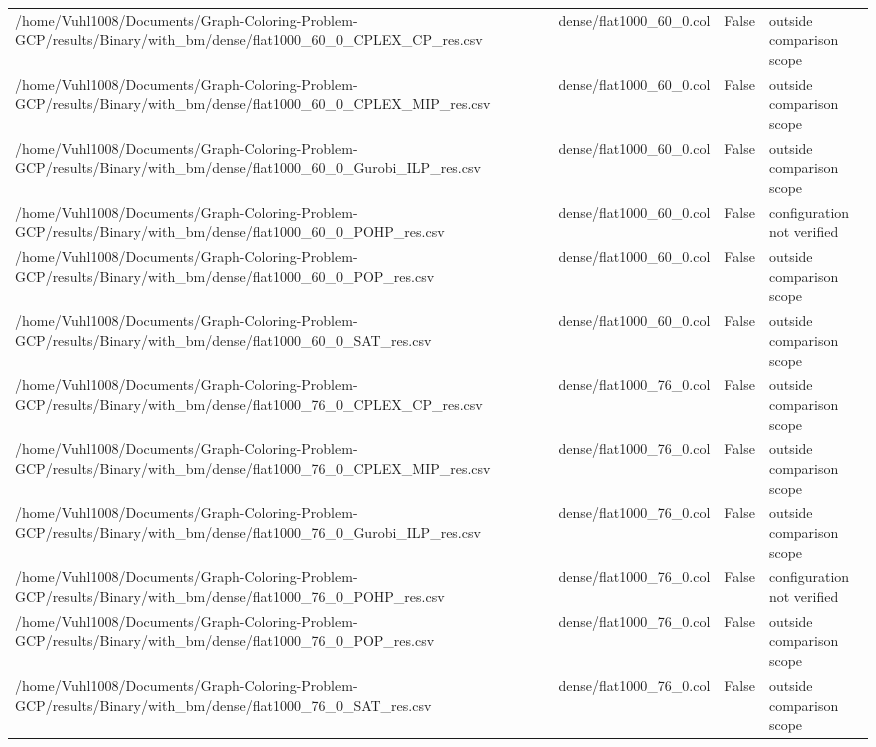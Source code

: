 \begin{table}[htbp]
\begin{tabular}{llll}
/home/Vuhl1008/Documents/Graph-Coloring-Problem-GCP/results/Binary/with\_bm/dense/flat1000\_60\_0\_CPLEX\_CP\_res.csv & dense/flat1000\_60\_0.col & False & outside comparison scope \\
/home/Vuhl1008/Documents/Graph-Coloring-Problem-GCP/results/Binary/with\_bm/dense/flat1000\_60\_0\_CPLEX\_MIP\_res.csv & dense/flat1000\_60\_0.col & False & outside comparison scope \\
/home/Vuhl1008/Documents/Graph-Coloring-Problem-GCP/results/Binary/with\_bm/dense/flat1000\_60\_0\_Gurobi\_ILP\_res.csv & dense/flat1000\_60\_0.col & False & outside comparison scope \\
/home/Vuhl1008/Documents/Graph-Coloring-Problem-GCP/results/Binary/with\_bm/dense/flat1000\_60\_0\_POHP\_res.csv & dense/flat1000\_60\_0.col & False & configuration not verified \\
/home/Vuhl1008/Documents/Graph-Coloring-Problem-GCP/results/Binary/with\_bm/dense/flat1000\_60\_0\_POP\_res.csv & dense/flat1000\_60\_0.col & False & outside comparison scope \\
/home/Vuhl1008/Documents/Graph-Coloring-Problem-GCP/results/Binary/with\_bm/dense/flat1000\_60\_0\_SAT\_res.csv & dense/flat1000\_60\_0.col & False & outside comparison scope \\
/home/Vuhl1008/Documents/Graph-Coloring-Problem-GCP/results/Binary/with\_bm/dense/flat1000\_76\_0\_CPLEX\_CP\_res.csv & dense/flat1000\_76\_0.col & False & outside comparison scope \\
/home/Vuhl1008/Documents/Graph-Coloring-Problem-GCP/results/Binary/with\_bm/dense/flat1000\_76\_0\_CPLEX\_MIP\_res.csv & dense/flat1000\_76\_0.col & False & outside comparison scope \\
/home/Vuhl1008/Documents/Graph-Coloring-Problem-GCP/results/Binary/with\_bm/dense/flat1000\_76\_0\_Gurobi\_ILP\_res.csv & dense/flat1000\_76\_0.col & False & outside comparison scope \\
/home/Vuhl1008/Documents/Graph-Coloring-Problem-GCP/results/Binary/with\_bm/dense/flat1000\_76\_0\_POHP\_res.csv & dense/flat1000\_76\_0.col & False & configuration not verified \\
/home/Vuhl1008/Documents/Graph-Coloring-Problem-GCP/results/Binary/with\_bm/dense/flat1000\_76\_0\_POP\_res.csv & dense/flat1000\_76\_0.col & False & outside comparison scope \\
/home/Vuhl1008/Documents/Graph-Coloring-Problem-GCP/results/Binary/with\_bm/dense/flat1000\_76\_0\_SAT\_res.csv & dense/flat1000\_76\_0.col & False & outside comparison scope \\

\end{tabular}
\end{table}
